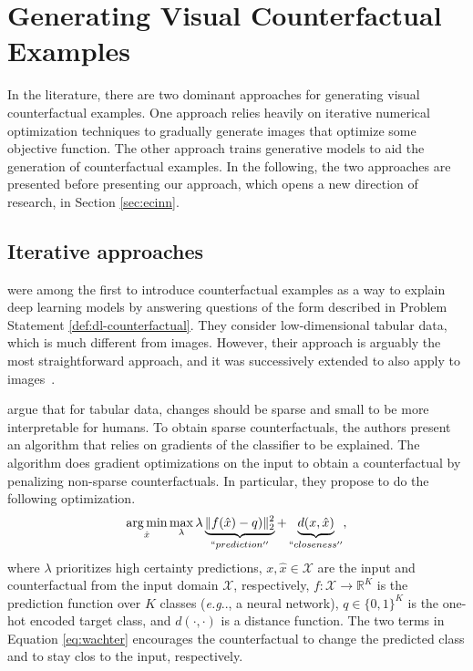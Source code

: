 \documentclass[11pt,a4paper,twoside,openright,final]{memoir}
\makeatletter
\DeclareMathOperator*{\argmin}{\arg\min}
\DeclareRobustCommand\onedot{\futurelet\@let@token\@onedot}
\def\@onedot{\ifx\@let@token.\else.\null\fi\xspace}
\def\eg{\emph{e.g}\onedot} \def\Eg{\emph{E.g}\onedot}
\makeatother
\begin{document}
\section{Generating Visual Counterfactual Examples}
In the literature, there are two dominant approaches for generating visual counterfactual examples.
One approach relies heavily on iterative numerical optimization techniques to gradually generate images that optimize some objective function.
The other approach trains generative models to aid the generation of counterfactual examples. 
In the following, the two approaches are presented before presenting our approach, which opens a new direction of research, in Section \ref{sec:ecinn}. 

\subsection{Iterative approaches}
\citet{Wachter2017} were among the first to introduce counterfactual examples as a way to explain deep learning models by answering questions of the form described in Problem Statement \ref{def:dl-counterfactual}. 
They consider low-dimensional tabular data, which is much different from images.
However, their approach is arguably the most straightforward approach, and it was successively extended to also apply to images~\cite{Dhurandhar2018, VanLooveren2019}. 

\citet{Wachter2017} argue that for tabular data, changes should be sparse and small to be more interpretable for humans.
To obtain sparse counterfactuals, the authors present an algorithm that relies on gradients of the classifier to be explained.
The algorithm does gradient optimizations on the input to obtain a counterfactual by penalizing non-sparse counterfactuals.
In particular, they propose to do the following optimization.
\begin{equation}\label{eq:wachter}
    \argmin_{\hat x} \max_\lambda 
    \lambda \underbrace{\|f(\hat x) - q)\|_2^2 }_{``prediction''}
    +       \underbrace{d(x, \hat x)}_{``closeness''},
\end{equation}
where $\lambda$ prioritizes high certainty predictions, $x, \hat x \in \mathcal{X}$ are the input and counterfactual from the input domain $\mathcal{X}$, respectively, $f: \mathcal{X} \rightarrow \mathbb{R}^K$ is the prediction function over $K$ classes (\eg, a neural network), $q\in \{0, 1\}^K$ is the one-hot encoded target class, and $d(\cdot, \cdot)$ is a distance function.
The two terms in Equation \eqref{eq:wachter} encourages the counterfactual to change the predicted class and to stay clos to the input, respectively.
\end{document}
